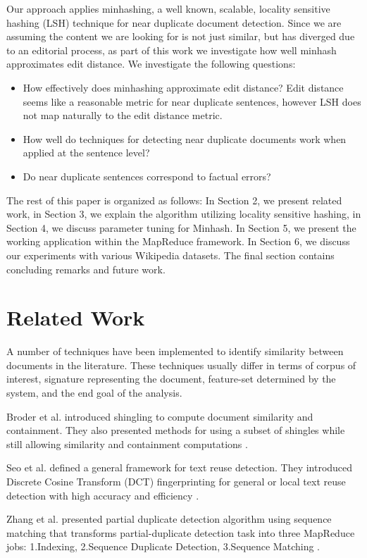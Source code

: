 \documentclass{acm_proc_article-sp}
\begin{document}
Our approach applies minhashing, a well known, scalable, locality sensitive hashing (LSH) technique for near duplicate document detection. Since we are assuming the content we are looking for is not just similar, but has diverged due to an editorial process, as part of this work we investigate how well minhash approximates edit distance.  
We investigate the following questions:
\begin{itemize}[noitemsep,nolistsep]
\item How effectively does minhashing approximate edit distance? Edit distance seems like a reasonable metric for near duplicate sentences, however LSH does not map naturally to the edit distance metric.
\item How well do techniques for detecting near duplicate documents work when applied at the sentence level?
\item Do near duplicate sentences correspond to factual errors?
\end{itemize}

The rest of this paper is organized as follows: In Section 2, we present related work, in Section 3, we explain the algorithm utilizing locality sensitive hashing, in Section 4, we discuss parameter tuning for Minhash. In Section 5, we present the working application within the MapReduce framework. In Section 6, we discuss our experiments with various Wikipedia datasets. The final section contains concluding remarks and future work.

\section{Related Work}
A number of techniques have been implemented to identify similarity between documents in the literature. These techniques usually differ in terms of corpus of interest, signature representing the document, feature-set determined by the system, and the end goal of the analysis.

Broder et al. introduced shingling to compute document similarity and containment. They also presented methods for using a subset of shingles while still allowing similarity and containment computations \cite{broder:resemblance}.

Seo et al. defined a general framework for text reuse detection. They introduced Discrete Cosine Transform (DCT) fingerprinting for general or local text reuse detection with high accuracy and efficiency \cite{seo:dct}.

Zhang et al. presented partial duplicate detection algorithm using sequence matching that transforms partial-duplicate detection task into three MapReduce jobs: 1.Indexing, 2.Sequence Duplicate Detection, 3.Sequence Matching \cite{zhang:pdc}.
\end{document}
